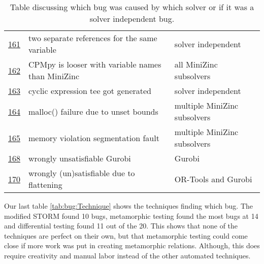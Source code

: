 \begin{table}[]
\begin{tabular}{lll}
		\href{https://github.com/CPMpy/cpmpy/issues/161}{161} & two separate references for the same variable     & solver independent           \\
		\href{https://github.com/CPMpy/cpmpy/issues/162}{162} & CPMpy is looser with variable names than MiniZinc & all MiniZinc subsolvers      \\
		\href{https://github.com/CPMpy/cpmpy/issues/163}{163} & cyclic expression tee got generated               & solver independent           \\
		\href{https://github.com/CPMpy/cpmpy/issues/164}{164} & malloc() failure due to unset bounds              & multiple MiniZinc subsolvers \\
		\href{https://github.com/CPMpy/cpmpy/issues/165}{165} & memory violation segmentation fault               & multiple MiniZinc subsolvers \\
		\href{https://github.com/CPMpy/cpmpy/issues/168}{168} & wrongly unsatisfiable Gurobi                      & Gurobi                       \\
		\href{https://github.com/CPMpy/cpmpy/issues/170}{170} & wrongly (un)satisfiable due to flattening         & OR-Tools and Gurobi          \\ \bottomrule
	\end{tabular}
	\caption{Table discussing which bug was caused by which solver or if it was a solver independent bug.}
	\label{tab:bug:Solver}
\end{table}

Our last table \ref{tab:bug:Technique} shows the techniques finding which bug. The modified STORM found 10 bugs, metamorphic testing found the most bugs at 14 and differential testing found 11 out of the 20. This shows that none of the techniques are perfect on their own, but that metamorphic testing could come close if more work was put in creating metamorphic relations. Although, this does require creativity and manual labor instead of the other automated techniques.


